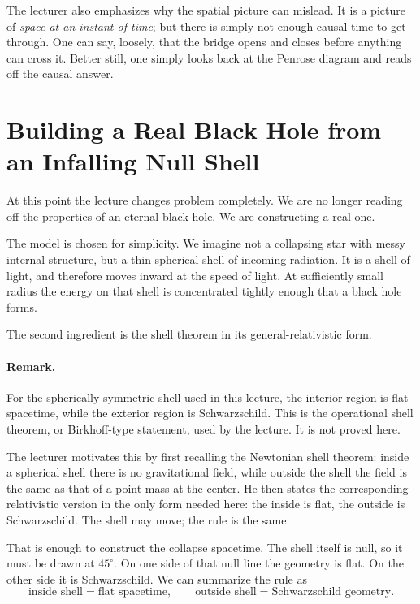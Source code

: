 The lecturer also emphasizes why the spatial picture can mislead. It is a picture of \emph{space at an instant of time}; but there is simply not enough causal time to get through. One can say, loosely, that the bridge opens and closes before anything can cross it. Better still, one simply looks back at the Penrose diagram and reads off the causal answer.

\section{Building a Real Black Hole from an Infalling Null Shell}

At this point the lecture changes problem completely. We are no longer reading off the properties of an eternal black hole. We are constructing a real one.

The model is chosen for simplicity. We imagine not a collapsing star with messy internal structure, but a thin spherical shell of incoming radiation. It is a shell of light, and therefore moves inward at the speed of light. At sufficiently small radius the energy on that shell is concentrated tightly enough that a black hole forms.

The second ingredient is the shell theorem in its general-relativistic form.

\paragraph{Remark.} For the spherically symmetric shell used in this lecture, the interior region is flat spacetime, while the exterior region is Schwarzschild. This is the operational shell theorem, or Birkhoff-type statement, used by the lecture. It is not proved here.

The lecturer motivates this by first recalling the Newtonian shell theorem: inside a spherical shell there is no gravitational field, while outside the shell the field is the same as that of a point mass at the center. He then states the corresponding relativistic version in the only form needed here: the inside is flat, the outside is Schwarzschild. The shell may move; the rule is the same.

That is enough to construct the collapse spacetime. The shell itself is null, so it must be drawn at \(45^\circ\). On one side of that null line the geometry is flat. On the other side it is Schwarzschild. We can summarize the rule as
\begin{equation}
\text{inside shell} = \text{flat spacetime},
\qquad
\text{outside shell} = \text{Schwarzschild geometry}.
\end{equation}

